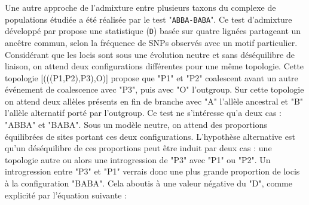 Une autre approche de l'admixture entre plusieurs taxons du complexe de populations étudiée a été réalisée par le test "\verb|ABBA-BABA|".
 Ce test d'admixture développé par \citet{Durand2011} propose une statistique (\verb|D|) basée sur quatre lignées partageant un ancêtre commun, selon la fréquence de SNPs observés avec un motif particulier.
 Considérant que les locis sont sous une évolution neutre et sans déséquilibre de liaison, on attend deux configurations différentes pour une même topologie.
 Cette topologie [(((P1,P2),P3),O)] propose que "P1" et "P2" coalescent avant un autre événement de coalescence avec "P3", puis avec "O" l'outgroup.
 Sur cette topologie on attend deux allèles présents en fin de branche avec "A" l'allèle ancestral et "B" l'allèle alternatif porté par l'outgroup.
 Ce test ne s'intéresse qu'a deux cas : "ABBA" et "BABA".
 Sous un modèle neutre, on attend des proportions équilibrées de sites portant ces deux configurations.
 L'hypothèse alternative est qu'un déséquilibre de ces proportions peut être induit par deux cas : une topologie autre ou alors une introgression de "P3" avec "P1" ou "P2".
 Un introgression entre "P3" et "P1" verrais donc une plus grande proportion de locis à la configuration "BABA".
 Cela aboutis à une valeur négative du "D", comme explicité par l'équation suivante :


